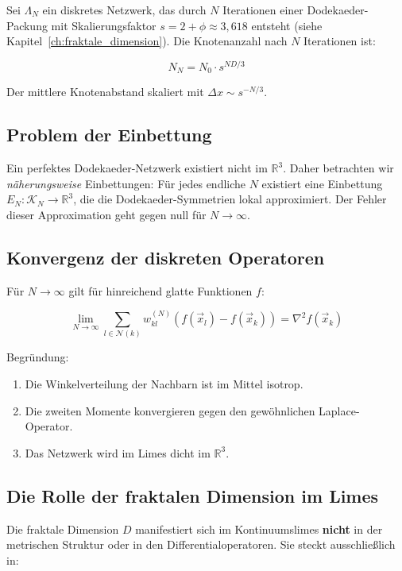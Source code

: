 Sei \( \Lambda_N \) ein diskretes Netzwerk, das durch \( N \) Iterationen einer
Dodekaeder-Packung mit Skalierungsfaktor \( s = 2 + \phi \approx 3,618 \)
entsteht (siehe Kapitel~\ref{ch:fraktale_dimension}). Die Knotenanzahl nach \( N \) Iterationen ist:

\[
N_N = N_0 \cdot s^{ND/3}
\]

Der mittlere Knotenabstand skaliert mit \( \Delta x \sim s^{-N/3} \).

\subsection{Problem der Einbettung}
\label{sub:kontinuumslimes_einbettung}

Ein perfektes Dodekaeder-Netzwerk existiert nicht im \( \mathbb{R}^3 \). Daher betrachten wir
\emph{näherungsweise} Einbettungen: Für jedes endliche \( N \) existiert eine Einbettung
\( E_N: \mathcal{K}_N \to \mathbb{R}^3 \), die die Dodekaeder-Symmetrien lokal approximiert.
Der Fehler dieser Approximation geht gegen null für \( N \to \infty \).

\subsection{Konvergenz der diskreten Operatoren}
\label{sub:kontinuumslimes_operatoren_konvergenz}

Für \( N \to \infty \) gilt für hinreichend glatte Funktionen \( f \):

\[
\lim_{N \to \infty} \sum_{l \in \mathcal{N}(k)} w_{kl}^{(N)} (f(\vec{x}_l) - f(\vec{x}_k)) = \nabla^2 f(\vec{x}_k)
\]

Begründung:
\begin{enumerate}
    \item Die Winkelverteilung der Nachbarn ist im Mittel isotrop.
    \item Die zweiten Momente konvergieren gegen den gewöhnlichen Laplace-Operator.
    \item Das Netzwerk wird im Limes dicht im \( \mathbb{R}^3 \).
\end{enumerate}

\subsection{Die Rolle der fraktalen Dimension im Limes}
\label{sub:kontinuumslimes_fraktale_rolle}

Die fraktale Dimension \( D \) manifestiert sich im Kontinuumslimes \textbf{nicht} in der
metrischen Struktur oder in den Differentialoperatoren. Sie steckt ausschließlich in:

